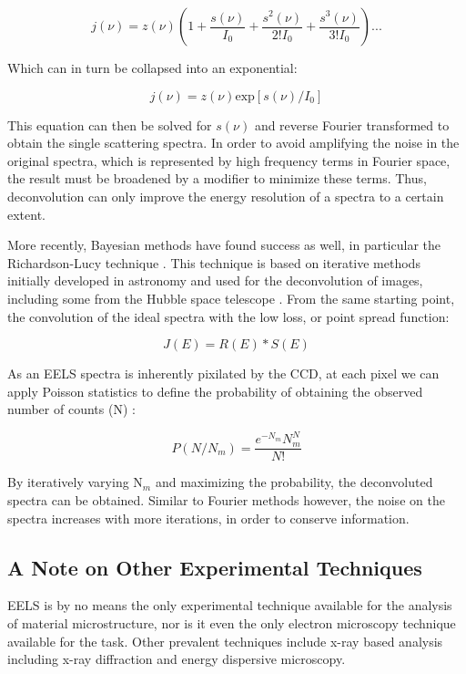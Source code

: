 \begin{equation}
j(\nu) = z(\nu) (1+\frac{s(\nu)}{I_0}+   \frac{s^2(\nu)}{2! I_0}+ \frac{s^3(\nu)}{3! I_0})...
\label{fourier_spectra}
\end{equation} 

Which can in turn be collapsed into an exponential:

\begin{equation}
j(\nu) = z(\nu)\mathrm{exp}[s(\nu)/I_0]
\end{equation}

This equation can then be solved for $s(\nu)$ and reverse Fourier transformed to obtain the single scattering spectra.  In order to avoid amplifying the noise in the original spectra, which is represented by high frequency terms in Fourier space, the result must be broadened by a modifier to minimize these terms.  Thus, deconvolution can only improve the energy resolution of a spectra to a certain extent.  

More recently, Bayesian methods have found success as well, in particular the Richardson-Lucy technique \cite{richardson_lucy}. This technique is based on iterative methods initially developed in astronomy and used for the deconvolution of images, including some from the Hubble space telescope \cite{hubble}.  From the same starting point, the convolution of the ideal spectra with the low loss, or point spread function:

\begin{equation}
J(E) = R(E)\ast S(E)
\end{equation}

As an EELS spectra is inherently pixilated by the CCD, at each pixel we can apply Poisson statistics to define the probability of obtaining the observed number of counts (N) \cite{richardson_lucy}:  

\begin{equation}
P (N/N_m) = \frac{e^{-N_m}N^N_m}{N!}
\end{equation}

By iteratively varying N$_m$ and maximizing the probability, the deconvoluted spectra can be obtained.  Similar to Fourier methods however, the noise on the spectra increases with more iterations, in order to conserve information.   


\subsection{A Note on Other Experimental Techniques}
EELS is by no means the only experimental technique available for the analysis of material microstructure, nor is it even the only electron microscopy technique available for the task. Other prevalent techniques include x-ray based analysis including x-ray diffraction and energy dispersive microscopy.    


